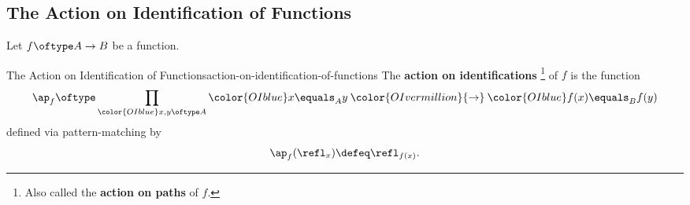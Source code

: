\subsection{The Action on Identification of Functions}\label{the-action-on-identification-of-functions}
Let $f\oftype A\to B$ be a function.
\begin{definition}{The Action on Identification of Functions}{action-on-identification-of-functions}%
    The \textbf{action on identifications}%
    \footnote{%
        Also called the \textbf{action on paths} of $f$.
        \par\vspace*{\TCBBoxCorrection}
    } %
    of $f$ is the function
    \[
        \ap_{f}%
        \oftype%
        \prod_{{\color{OIblue}x,y\oftype A}}{\color{OIblue}x\equals_{A}y}\mathbin{\color{OIvermillion}{\to}}{\color{OIblue}f(x)\equals_{B}f(y)}%
    \]%
    defined via pattern-matching by
    \[
        \ap_{f}(\refl_{x})%
        \defeq%
        \refl_{f(x)}.%
    \]%
\end{definition}
